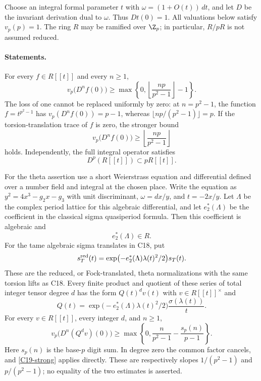 \documentclass[11pt]{article}
\theoremstyle{definition}\newtheorem{definition}[theorem]{Definition}\newtheorem{remark}[theorem]{Remark}
\begin{document}
Choose an integral formal parameter $t$ with
$\omega=(1+O(t))\,dt$, and let $D$ be the invariant derivation dual
to $\omega$.  Thus $Dt(0)=1$.  All valuations below satisfy
$v_p(p)=1$.  The ring $R$ may be ramified over $\Z_p$; in
particular, $R/pR$ is not assumed reduced.

\paragraph{Statements.}
For every $f\in R[[t]]$ and every $n\geq1$,
\begin{equation}\label{C19-strong}
 v_p\bigl(D^nf(0)\bigr)
 \geq\max\left\{0,
       \left\lfloor\frac{np}{p^2-1}\right\rfloor-1\right\}.
\end{equation}
The loss of one cannot be replaced uniformly by zero: at
$n=p^2-1$, the function $f=t^{p^2-1}$ has
$v_p(D^nf(0))=p-1$, whereas
$\lfloor np/(p^2-1)\rfloor=p$.
If the torsion-translation trace of $f$ is zero, the stronger bound
\begin{equation}\label{C19-trace-zero}
 v_p\bigl(D^nf(0)\bigr)
       \geq\left\lfloor\frac{np}{p^2-1}\right\rfloor
\end{equation}
holds.  Independently, the full integral operator satisfies
\begin{equation}\label{C19-Dp}
 D^p(R[[t]])\subset pR[[t]].
\end{equation}

For the theta assertion use a short Weierstrass equation and
differential defined over a number field and integral at the
chosen place.  Write the equation as
$y^2=4x^3-g_2x-g_3$ with unit discriminant,
$\omega=dx/y$, and $t=-2x/y$.  Let $\Lambda$ be the complex period
lattice for this algebraic differential, and let $e_2^*(\Lambda)$
be the coefficient in the classical sigma quasiperiod formula.
Then this coefficient is algebraic and
\begin{equation}\label{C19-e2-integral}
 e_2^*(\Lambda)\in R.
\end{equation}
For the tame algebraic sigma translates in C18, put
\[
 s_T^{\rm red}(t)=
 \exp\bigl(-e_2^*(\Lambda)\lambda(t)^2/2\bigr)s_T(t).
\]
These are the reduced, or Fock-translated, theta normalizations
with the same torsion lifts as C18.  Every finite product and
quotient of these series of total integer tensor degree $d$ has
the form $Q(t)^d v(t)$ with $v\in R[[t]]^\times$ and
\[
 Q(t)=\exp\bigl(-e_2^*(\Lambda)\lambda(t)^2/2\bigr)
            \frac{\sigma(\lambda(t))}{t}.
\]
For every $v\in R[[t]]$, every integer $d$, and $n\geq1$,
\begin{equation}\label{C19-theta-weak}
 v_p\bigl(D^n(Q^dv)(0)\bigr)
 \geq\max\left\{0,
       \frac{n}{p^2-1}-\frac{s_p(n)}{p-1}\right\}.
\end{equation}
Here $s_p(n)$ is the base-$p$ digit sum.  In degree zero the common
factor cancels, and \eqref{C19-strong} applies directly.
These are respectively slopes $1/(p^2-1)$ and $p/(p^2-1)$;
no equality of the two estimates is asserted.
\end{document}
